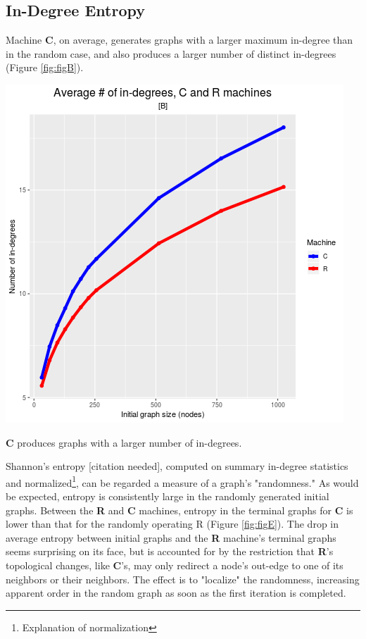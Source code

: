 \documentclass{tufte-handout}
\begin{document}
\subsection{In-Degree Entropy}

Machine \textbf{C}, on average, generates graphs with a larger 
maximum in-degree than in the random case, and also produces a
larger number of distinct in-degrees (Figure \ref{fig:figB}).

\begin{marginfigure}
  \includegraphics{figB.png}
  \caption{\textbf{C} produces graphs with a larger number of in-degrees.}
  \label{fig:figB}
\end{marginfigure}

Shannon's entropy [citation needed], computed on summary in-degree statistics and
normalized\footnote{Explanation of normalization}, can be regarded a measure of
a graph's "randomness."
As would be expected, entropy is consistently large in the randomly generated
initial graphs. Between the \textbf{R} and \textbf{C} machines, entropy in the terminal
graphs for \textbf{C} is lower than that for the randomly operating R (Figure \ref{fig:figE}).
The drop in average entropy between initial graphs and the \textbf{R} machine's terminal
graphs seems surprising on its face, but is accounted for by the restriction that
\textbf{R}'s topological changes, like \textbf{C}'s, may only redirect a node's out-edge
to one of its neighbors or their neighbors.
The effect is to "localize" the randomness, increasing apparent order in the random graph as
soon as the first iteration is completed.
\end{document}
